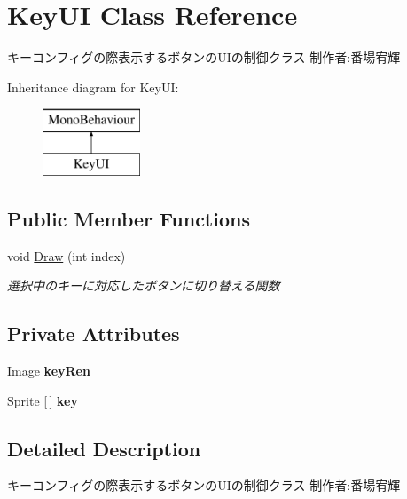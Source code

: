 \hypertarget{class_key_u_i}{}\section{Key\+UI Class Reference}
\label{class_key_u_i}


キーコンフィグの際表示するボタンの\+U\+Iの制御クラス 制作者\+:番場宥輝  


Inheritance diagram for Key\+UI\+:\begin{figure}[H]
\begin{center}
\leavevmode
\includegraphics[height=2.000000cm]{class_key_u_i}
\end{center}
\end{figure}
\subsection*{Public Member Functions}
\begin{DoxyCompactItemize}
\item 
void \hyperlink{class_key_u_i_ab3b1c1baabb2fd2736359804b00c2db7}{Draw} (int index)
\begin{DoxyCompactList}\small\item\em 選択中のキーに対応したボタンに切り替える関数 \end{DoxyCompactList}\end{DoxyCompactItemize}
\subsection*{Private Attributes}
\begin{DoxyCompactItemize}
\item 
\mbox{\label{class_key_u_i_af5ffb754774cd7131f544654982deaaf}} 
Image {\bfseries key\+Ren}
\item 
\mbox{\label{class_key_u_i_aa12528a103156a3532cbc196ab88caae}} 
Sprite \mbox{[}$\,$\mbox{]} {\bfseries key}
\end{DoxyCompactItemize}


\subsection{Detailed Description}
キーコンフィグの際表示するボタンの\+U\+Iの制御クラス 制作者\+:番場宥輝 



